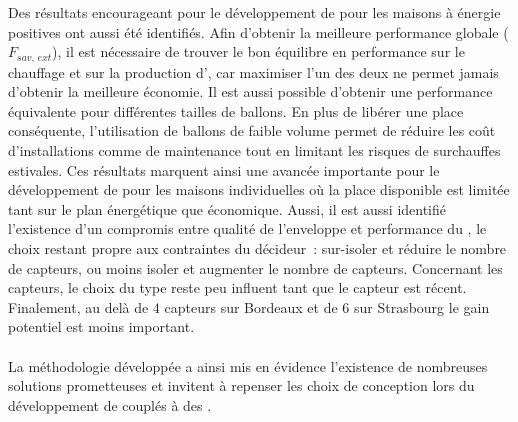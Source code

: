 Des résultats encourageant pour le développement de  pour les maisons à énergie
positives ont aussi été identifiés. Afin d’obtenir la meilleure performance globale
($F_{sav,\, ext}$), il est nécessaire de trouver le bon équilibre en performance sur le
chauffage et sur la production d’, car maximiser l’un des deux ne permet jamais
d’obtenir la meilleure économie. Il est aussi possible d’obtenir une performance
équivalente pour différentes tailles de ballons. En plus de libérer une place conséquente,
l’utilisation de ballons de faible volume permet de réduire les coût d’installations comme
de maintenance tout en limitant les risques de surchauffes estivales. Ces résultats
marquent ainsi une avancée importante pour le développement de
 pour les maisons individuelles où la place disponible est limitée tant sur le
plan énergétique que économique.
Aussi, il est aussi identifié l’existence d’un compromis entre qualité de l’enveloppe et
performance du , le choix restant propre aux contraintes du décideur~: sur-isoler
et réduire le nombre de capteurs, ou moins isoler et augmenter le nombre de capteurs.
Concernant les capteurs, le choix du type reste peu influent tant que le capteur
est récent. Finalement, au delà de $4$ capteurs sur Bordeaux et de $6$ sur Strasbourg le
gain potentiel est moins important.

\paragraph{} %
La méthodologie développée a ainsi mis en évidence l’existence de nombreuses solutions
prometteuses et invitent à repenser les choix de conception lors du développement de
 couplés à des .
